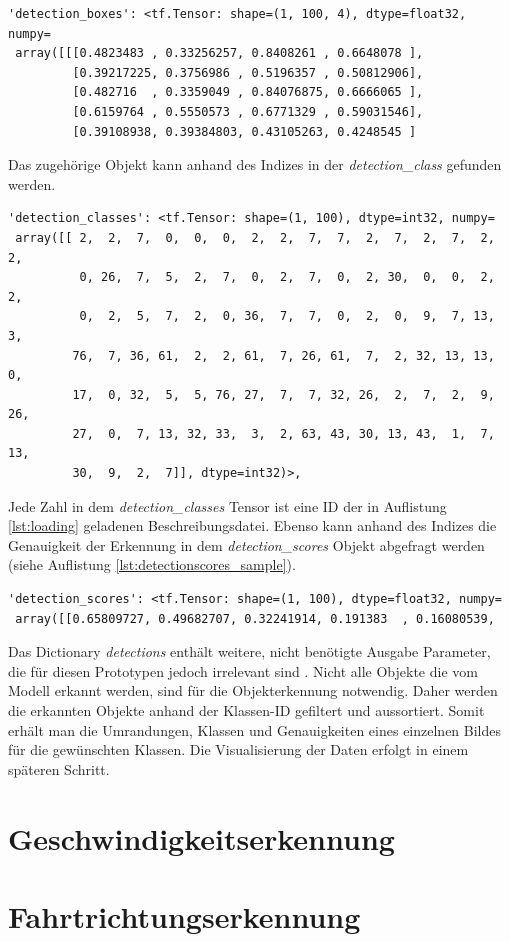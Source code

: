 \vspace*{10mm}
\begin{lstlisting}[caption={Beispielausschnitt der detection boxes}, label={lst:detectionbox_sample}]
'detection_boxes': <tf.Tensor: shape=(1, 100, 4), dtype=float32, numpy=
 array([[[0.4823483 , 0.33256257, 0.8408261 , 0.6648078 ],
         [0.39217225, 0.3756986 , 0.5196357 , 0.50812906],
         [0.482716  , 0.3359049 , 0.84076875, 0.6666065 ],
         [0.6159764 , 0.5550573 , 0.6771329 , 0.59031546],
         [0.39108938, 0.39384803, 0.43105263, 0.4248545 ]
\end{lstlisting}

Das zugehörige Objekt kann anhand des Indizes in der \emph{detection\_class} gefunden werden.

\vspace*{5mm}
\begin{lstlisting}[caption={Beispielausschnitt der detection classes}, label={lst:detectionclasses_sample}]
'detection_classes': <tf.Tensor: shape=(1, 100), dtype=int32, numpy=
 array([[ 2,  2,  7,  0,  0,  0,  2,  2,  7,  7,  2,  7,  2,  7,  2,  2,
          0, 26,  7,  5,  2,  7,  0,  2,  7,  0,  2, 30,  0,  0,  2,  2,
          0,  2,  5,  7,  2,  0, 36,  7,  7,  0,  2,  0,  9,  7, 13,  3,
         76,  7, 36, 61,  2,  2, 61,  7, 26, 61,  7,  2, 32, 13, 13,  0,
         17,  0, 32,  5,  5, 76, 27,  7,  7, 32, 26,  2,  7,  2,  9, 26,
         27,  0,  7, 13, 32, 33,  3,  2, 63, 43, 30, 13, 43,  1,  7, 13,
         30,  9,  2,  7]], dtype=int32)>,
\end{lstlisting}

Jede Zahl in dem \emph{detection\_classes} Tensor ist eine ID der in Auflistung \ref{lst:loading} geladenen Beschreibungsdatei. Ebenso kann anhand des Indizes die Genauigkeit der Erkennung in dem \emph{detection\_scores} Objekt abgefragt werden (siehe Auflistung \ref{lst:detectionscores_sample}).

\vspace*{5mm}
\begin{lstlisting}[caption={Beispielausschnitt der detection scores}, label={lst:detectionscores_sample}]
'detection_scores': <tf.Tensor: shape=(1, 100), dtype=float32, numpy=
 array([[0.65809727, 0.49682707, 0.32241914, 0.191383  , 0.16080539,
\end{lstlisting}

Das Dictionary \emph{detections} enthält weitere, nicht benötigte Ausgabe Parameter, die für diesen Prototypen jedoch irrelevant sind \cite{efficientdet}. Nicht alle Objekte die vom Modell erkannt werden, sind für die Objekterkennung notwendig. Daher werden die erkannten Objekte anhand der Klassen-ID gefiltert und aussortiert. Somit erhält man die Umrandungen, Klassen und Genauigkeiten eines einzelnen Bildes für die gewünschten Klassen. Die Visualisierung der Daten erfolgt in einem späteren Schritt. 

\section{Geschwindigkeitserkennung}

\section{Fahrtrichtungserkennung}






